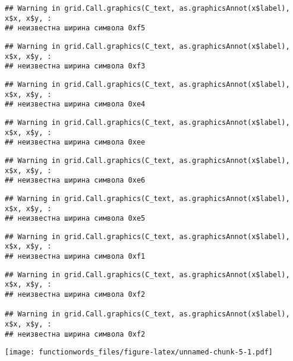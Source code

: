 \documentclass[
]{article}
\newenvironment{Shaded}{\begin{snugshade}}{\end{snugshade}}
\newcommand{\DataTypeTok}[1]{\textcolor[rgb]{0.13,0.29,0.53}{#1}}
\newcommand{\KeywordTok}[1]{\textcolor[rgb]{0.13,0.29,0.53}{\textbf{#1}}}
\newcommand{\NormalTok}[1]{#1}
\newcommand{\OperatorTok}[1]{\textcolor[rgb]{0.81,0.36,0.00}{\textbf{#1}}}
\newcommand{\StringTok}[1]{\textcolor[rgb]{0.31,0.60,0.02}{#1}}
\begin{document}
\begin{verbatim}
## Warning in grid.Call.graphics(C_text, as.graphicsAnnot(x$label), x$x, x$y, :
## неизвестна ширина символа 0xf5
\end{verbatim}

\begin{verbatim}
## Warning in grid.Call.graphics(C_text, as.graphicsAnnot(x$label), x$x, x$y, :
## неизвестна ширина символа 0xf3
\end{verbatim}

\begin{verbatim}
## Warning in grid.Call.graphics(C_text, as.graphicsAnnot(x$label), x$x, x$y, :
## неизвестна ширина символа 0xe4
\end{verbatim}

\begin{verbatim}
## Warning in grid.Call.graphics(C_text, as.graphicsAnnot(x$label), x$x, x$y, :
## неизвестна ширина символа 0xee
\end{verbatim}

\begin{verbatim}
## Warning in grid.Call.graphics(C_text, as.graphicsAnnot(x$label), x$x, x$y, :
## неизвестна ширина символа 0xe6
\end{verbatim}

\begin{verbatim}
## Warning in grid.Call.graphics(C_text, as.graphicsAnnot(x$label), x$x, x$y, :
## неизвестна ширина символа 0xe5
\end{verbatim}

\begin{verbatim}
## Warning in grid.Call.graphics(C_text, as.graphicsAnnot(x$label), x$x, x$y, :
## неизвестна ширина символа 0xf1
\end{verbatim}

\begin{verbatim}
## Warning in grid.Call.graphics(C_text, as.graphicsAnnot(x$label), x$x, x$y, :
## неизвестна ширина символа 0xf2

## Warning in grid.Call.graphics(C_text, as.graphicsAnnot(x$label), x$x, x$y, :
## неизвестна ширина символа 0xf2
\end{verbatim}

\texttt{[image: functionwords\_files/figure-latex/unnamed-chunk-5-1.pdf]}

\begin{Shaded}
\end{Shaded}
\end{document}
